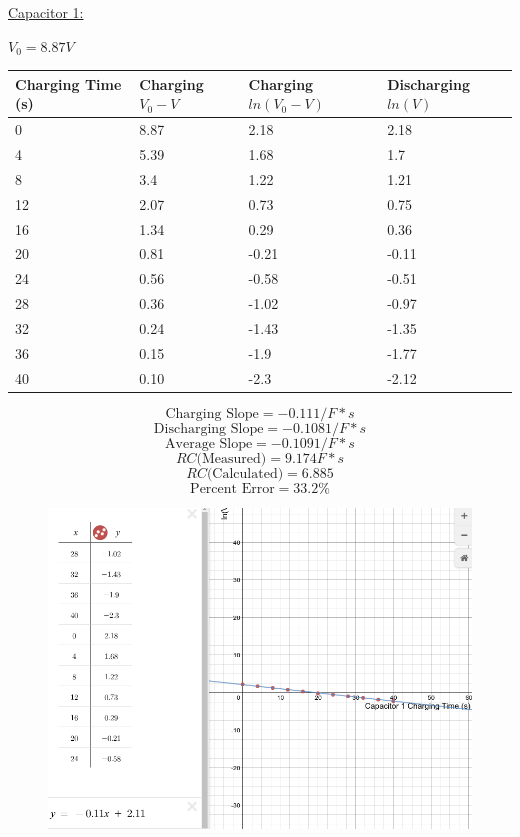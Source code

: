 \documentclass[11pt, titlepage]{article}
\begin{document}
\underline{Capacitor 1:}
\begin{center}
$V_0 = 8.87 V$
\begin{tabular}
{|m{6em}|m{6em}|m{6em}|m{6em}|}
\hline
Charging Time (s) & Charging $V_0 - V$ & Charging $ln(V_0 - V)$ & Discharging $ln(V)$ \\
\hline
0 & 8.87 & 2.18 & 2.18\\
\hline
4 & 5.39 & 1.68 & 1.7\\
\hline
8 & 3.4 & 1.22 & 1.21\\
\hline
12 & 2.07 & 0.73 & 0.75\\
\hline
16 & 1.34 & 0.29 & 0.36\\
\hline
20 & 0.81 & -0.21 & -0.11\\
\hline
24 & 0.56 & -0.58 & -0.51\\
\hline
28 & 0.36 & -1.02 & -0.97\\
\hline
32 & 0.24 & -1.43 & -1.35\\
\hline
36 & 0.15 & -1.9 & -1.77\\
\hline
40 & 0.10 & -2.3 & -2.12\\
\hline
\end{tabular}
$$\text{Charging Slope} = -0.11 1/F*s$$
$$\text{Discharging Slope} = -0.108 1/F*s$$
$$\text{Average Slope} = -0.109 1/F*s$$
$$RC \text{(Measured)} = 9.174 F*s$$
$$RC \text{(Calculated)} = 6.885$$
$$\text{Percent Error} = 33.2\%$$
\end{center}

\begin{figure}[h]
\centering
\hspace*{0cm}
\includegraphics[scale=0.6]{graph31.jpg}
\vspace*{0cm}
\end{figure}
\end{document}
